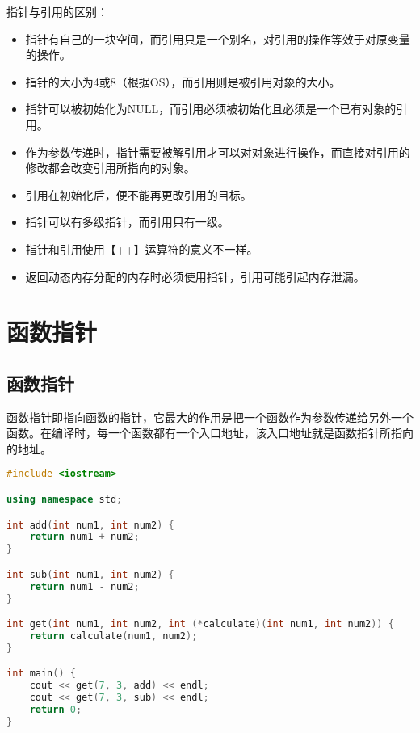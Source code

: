 指针与引用的区别：

\begin{itemize}
	\item 指针有自己的一块空间，而引用只是一个别名，对引用的操作等效于对原变量的操作。

	\item 指针的大小为4或8（根据OS），而引用则是被引用对象的大小。

	\item 指针可以被初始化为NULL，而引用必须被初始化且必须是一个已有对象的引用。

	\item 作为参数传递时，指针需要被解引用才可以对对象进行操作，而直接对引用的修改都会改变引用所指向的对象。

	\item 引用在初始化后，便不能再更改引用的目标。

	\item 指针可以有多级指针，而引用只有一级。

	\item 指针和引用使用【++】运算符的意义不一样。

	\item 返回动态内存分配的内存时必须使用指针，引用可能引起内存泄漏。
\end{itemize}

\newpage

\section{函数指针}

\subsection{函数指针}

函数指针即指向函数的指针，它最大的作用是把一个函数作为参数传递给另外一个函数。在编译时，每一个函数都有一个入口地址，该入口地址就是函数指针所指向的地址。\\


\begin{lstlisting}[language=C++]
#include <iostream>

using namespace std;

int add(int num1, int num2) {
    return num1 + num2;
}

int sub(int num1, int num2) {
    return num1 - num2;
}

int get(int num1, int num2, int (*calculate)(int num1, int num2)) {
    return calculate(num1, num2);
}

int main() {
    cout << get(7, 3, add) << endl;
    cout << get(7, 3, sub) << endl;
    return 0;
}
\end{lstlisting}

